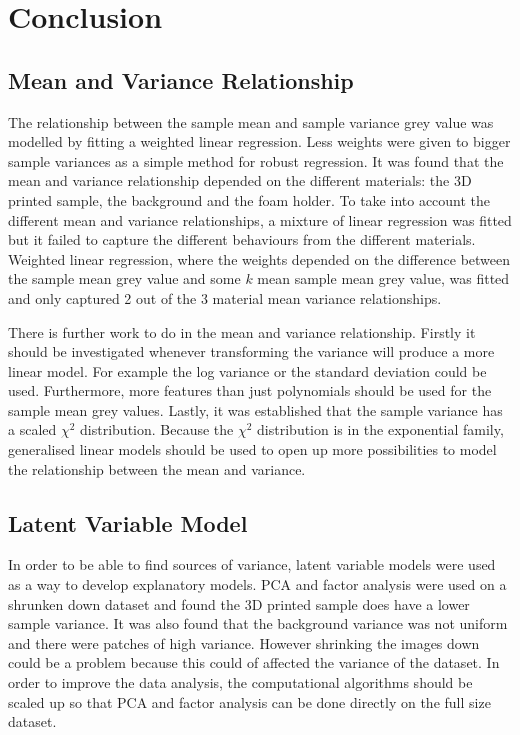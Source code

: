 \documentclass[12pt]{report}
\begin{document}
\chapter{Conclusion}

\section{Mean and Variance Relationship}
The relationship between the sample mean and sample variance grey value was modelled by fitting a weighted linear regression. Less weights were given to bigger sample variances as a simple method for robust regression. It was found that the mean and variance relationship depended on the different materials: the 3D printed sample, the background and the foam holder. To take into account the different mean and variance relationships, a mixture of linear regression was fitted but it failed to capture the different behaviours from the different materials. Weighted linear regression, where the weights depended on the difference between the sample mean grey value and some $k$ mean sample mean grey value, was fitted and only captured 2 out of the 3 material mean variance relationships.

There is further work to do in the mean and variance relationship. Firstly it should be investigated whenever transforming the variance will produce a more linear model. For example the log variance or the standard deviation could be used. Furthermore, more features than just polynomials should be used for the sample mean grey values. Lastly, it was established that the sample variance has a scaled $\chi^2$ distribution. Because the $\chi^2$ distribution is in the exponential family, generalised linear models \cite{mccullagh1989generalized} should be used to open up more possibilities to model the relationship between the mean and variance.

\section{Latent Variable Model}
In order to be able to find sources of variance, latent variable models were used as a way to develop explanatory models. PCA and factor analysis were used on a shrunken down dataset and found the 3D printed sample does have a lower sample variance. It was also found that the background variance was not uniform and there were patches of high variance. However shrinking the images down could be a problem because this could of affected the variance of the dataset. In order to improve the data analysis, the computational algorithms should be scaled up so that PCA and factor analysis can be done directly on the full size dataset.
\end{document}
